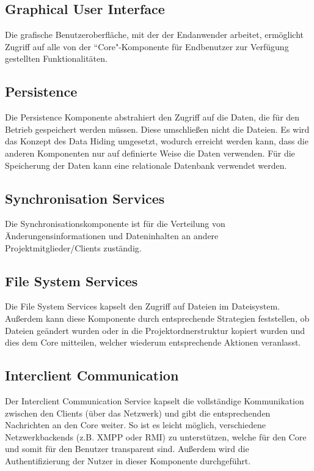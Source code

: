 \subsection{Graphical User Interface}
Die grafische Benutzeroberfläche, mit der der Endanwender arbeitet, ermöglicht Zugriff auf alle von der ``Core"-Komponente für Endbenutzer zur Verfügung gestellten
Funktionalitäten.

\subsection{Persistence} 
Die Persistence Komponente abstrahiert den Zugriff auf die Daten, die für den Betrieb gespeichert werden müssen. Diese umschließen nicht die Dateien. Es wird das Konzept des Data Hiding umgesetzt, wodurch erreicht werden kann, dass die anderen Komponenten nur auf definierte Weise die Daten verwenden. Für die Speicherung der Daten kann eine relationale Datenbank verwendet werden.

\subsection{Synchronisation Services}
Die Synchronisationskomponente ist für die Verteilung von Änderungensinformationen und Dateninhalten an andere Projektmitglieder/Clients zuständig. 

\subsection{File System Services}
Die File System Services kapselt den Zugriff auf Dateien im Dateisystem. Außerdem kann diese Komponente durch entsprechende Strategien feststellen, ob Dateien geändert wurden oder in die Projektordnerstruktur kopiert wurden und dies dem Core mitteilen, welcher wiederum entsprechende Aktionen veranlasst.

\subsection{Interclient Communication} 
Der Interclient Communication Service kapselt die vollständige Kommunikation zwischen den Clients (über das Netzwerk) und gibt die entsprechenden Nachrichten an den Core weiter. So ist es leicht möglich, verschiedene Netzwerkbackends (z.B. XMPP oder RMI) zu unterstützen, welche für den Core und somit für den Benutzer transparent sind. Außerdem wird die Authentifizierung der Nutzer in dieser Komponente durchgeführt. 

